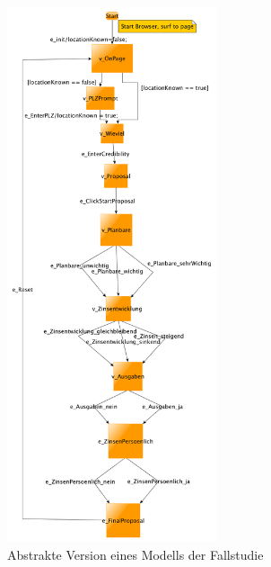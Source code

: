 \begin{figure} 
  \centering
     \includegraphics[width=0.55\textwidth]{figures/modell_abstract.png}
  \caption{Abstrakte Version eines Modells der Fallstudie}
  \label{fig:modell_abstract}
\end{figure}

